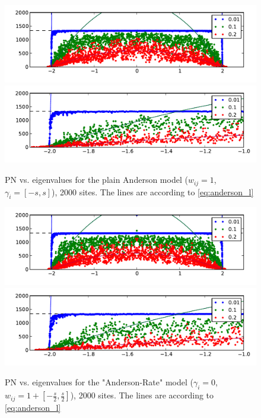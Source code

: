 \documentclass[onecolumn,fleqn]{revtex4}
\begin{document}
\begin{figure}[H]
\includegraphics{pta_anderson_b1}\\
\includegraphics{pta_anderson_b1_zoom}
\caption{PN vs. eigenvalues for the plain Anderson model ($w_{ij}=1$, $\gamma_i = [-s,s]$), 2000 sites. 
The lines are according to \autoref{eq:anderson_l}
}\label{fig:anderson}
\end{figure}

\begin{figure}[H]
\includegraphics{pta_anderson_rates_b1}\\
\includegraphics{pta_anderson_rates_b1_zoom}
\caption{PN vs. eigenvalues for the "Anderson-Rate" model ($\gamma_i = 0$, $w_{ij} = 1 + \left[-\frac{s}{2}, \frac{s}{2}\right]$), 2000 sites. 
The lines are according to \autoref{eq:anderson_l}
}\label{fig:anderson_rate}
\end{figure}
\end{document}
